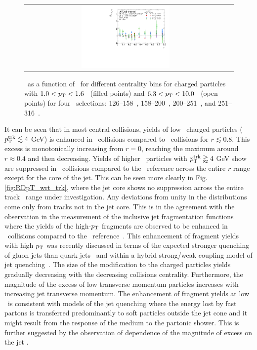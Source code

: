 \begin{figure}
{\begin{tabular}{cc}
	 \includegraphics[width=0.45\textwidth]{figures_results/RDpT_final_ratio_dR_CONF_data_trk2_6_cent5} \\
\end{tabular} }
   \caption{\RDptr\ as a function of \rvar\ for different centrality bins for charged particles with \mbox{$1.0 < p_{\mathrm{T}} < 1.6$ \GeV}
(filled points) and $6.3 < p_{\mathrm{T}} < 10.0 $ \GeV\ (open points) for four \ptjet\ selections: 126--158~\GeV, 158--200~\GeV,
200--251~\GeV, and 251--316~\GeV.}
      \label{fig:ptjetdep}
\end{figure}



It can be seen that in most central collisions, yields of low \pt\ charged particles ($\mbox{$p_{\mathrm{T}}^{\mathrm{trk}}$} \lesssim 4$ GeV) is enhanced in \PbPb\ collisions compared to \pp\ collisions for $r \lesssim 0.8$. This excess is monotonically increasing from $r=0$, reaching the maximum around $r\approx0.4$ and then decreasing. Yields of higher \pt\ particles with $\mbox{$p_{\mathrm{T}}^{\mathrm{trk}}$} \gtrapprox 4$ GeV show are suppressed in \PbPb\ collisions compared to the \pp\ reference across the entire $r$ range except for the core of the jet. This can be seen more clearly in Fig.\ref{fig:RDpT_wrt_trk}, where the jet core shows no suppression across the entire track \pt\ range under investigation. Any deviations from unity in the \RDptr distributions come only from tracks not in the jet core. This is in the agreement with the observation in the measurement of the inclusive jet fragmentation functions where the yields of the high-$p_{\mathrm{T}}$ fragments are observed to be enhanced in \PbPb\ collisions compared to the \pp\ reference~\cite{ATLAS502FFConf}. This enhancement of fragment yields with high $p_{\mathrm{T}}$ was recently discussed in terms of the expected stronger quenching of  gluon jets than quark jets~\cite{Spousta:2015fca} and within a hybrid strong/weak coupling model of jet quenching~\cite{Hulcher:2017cpt}.  The size of the modification to the charged particles yields gradually decreasing with the  decreasing collisions centrality. Furthermore, the magnitude of the excess of low transverse momentum particles increases with increasing jet transverse momentum. The enhancement of fragment yields at low \pT\ is consistent with models of the jet quenching where the energy lost by fast partons is transferred predominantly to soft particles outside the jet cone and it might result from the response of the medium to the partonic shower. This is further suggested by the observation of dependence of the magnitude of excess on the jet \pt.

